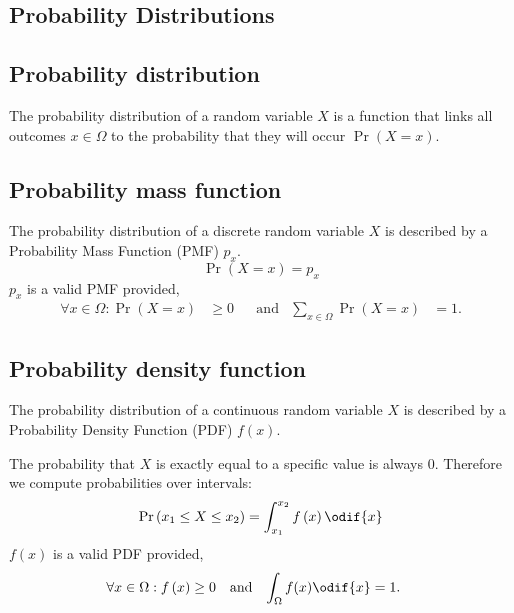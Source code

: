 \documentclass{article}
\begin{document}
\begin{multicols}{3}
    \subsection{Probability Distributions}
    \subsection{Probability distribution}
    The probability distribution of a random variable \(X\) is a function that links all outcomes \(x \in \Omega\)
    to the probability that they will occur \(\Pr{\left( X = x \right)}\).
    \subsection{Probability mass function}
    The probability distribution of a discrete random variable \(X\) is described by a Probability
    Mass Function (PMF) \(p_x\).
    \begin{equation*}
        \Pr{\left( X = x \right)} = p_x
    \end{equation*}
    \(p_x\) is a valid PMF provided,
    \begin{align*}
        \forall x \in \Omega : \Pr{\left( X = x \right)} & \geq 0 &  & \text{and} & \sum_{x \in \Omega} \Pr{\left( X = x \right)} & = 1.
    \end{align*}
    \subsection{Probability density function}
    The probability distribution of a continuous random variable \(X\) is described by a Probability
    Density Function (PDF) \(f\left( x \right)\).

    The probability that \(X\) is exactly equal to a
    specific value is always 0. Therefore we compute probabilities over intervals:
    \begin{equation*}
        \Pr{\left( x_1 \leq X \leq x_2 \right)} = \int_{x_1}^{x_2} f\left( x \right) \odif{x}
    \end{equation*}
    \(f\left( x \right)\) is a valid PDF provided,
    \begin{align*}
        \forall x \in \Omega : f\left( x \right) & \geq 0 &  & \text{and} & \int_{\Omega} f(x) \odif{x} & = 1.
    \end{align*}

\end{multicols}
\end{document}
